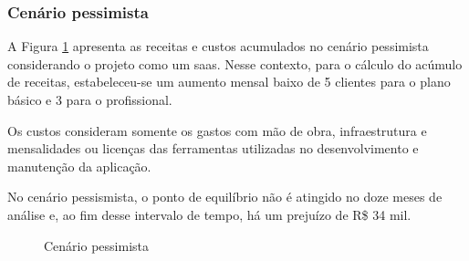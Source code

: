 \subsubsection{Cenário pessimista}

A Figura \ref{fig:cenario-pessimista} apresenta as receitas e custos acumulados no cenário pessimista considerando o projeto como um \gls{saas}. Nesse contexto, para o cálculo do acúmulo de receitas, estabeleceu-se um aumento mensal baixo de 5 clientes para o plano básico e 3 para o profissional.

Os custos consideram somente os gastos com mão de obra, infraestrutura e mensalidades ou licenças das ferramentas utilizadas no desenvolvimento e manutenção da aplicação.

No cenário pessismista, o ponto de equilíbrio não é atingido no doze meses de análise e, ao fim desse intervalo de tempo, há um prejuízo de R\$ 34 mil.
\begin{figure}[h]
	\centering
	\caption{Cenário pessimista}
	\label{fig:cenario-pessimista}
\end{figure}